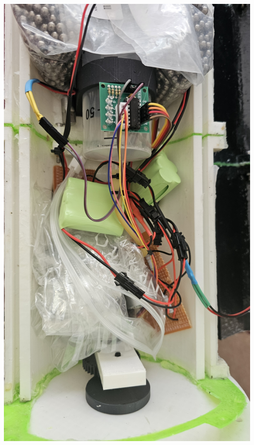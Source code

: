 \documentclass[11pt,a4paper,titlepage]{report}
\begin{document}
	\begin{center}
		\label{picture:images_build_6}
		\includegraphics[width=\linewidth]{assets/AUV_Build6.jpg}
	\end{center}
\end{document}
